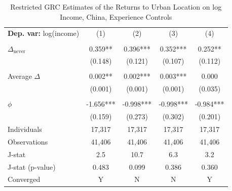 \begin{table}[htbp] \centering \begin{threeparttable}
 \caption{Restricted GRC Estimates of the Returns to Urban Location on log Income, China, Experience Controls} 
 \label{tab:GRC_CHN_income_urban_unb_exp} 
\begin{tabular}{l cccc} \toprule  \textbf{Dep. var:}  log(income) 
                    &\multicolumn{1}{c}{(1)}   &\multicolumn{1}{c}{(2)}   &\multicolumn{1}{c}{(3)}   &\multicolumn{1}{c}{(4)}   \\
                    &               &               &               &               \\
\addlinespace
$\Delta_{\text{never}}$&       0.359** &       0.396***&       0.352***&       0.252** \\
                    &     (0.148)   &     (0.121)   &     (0.107)   &     (0.112)   \\
                    &               &               &               &               \\
\addlinespace
Average $\Delta$    &       0.002** &       0.002***&       0.003***&       0.000   \\
                    &     (0.001)   &     (0.001)   &     (0.001)   &     (0.035)   \\
                    &               &               &               &               \\
\addlinespace
$\phi$              &      -1.656***&      -0.998***&      -0.998***&      -0.984***\\
                    &     (0.159)   &     (0.273)   &     (0.302)   &     (0.201)   \\
\addlinespace
Individuals         &      17,317   &      17,317   &      17,317   &      17,317   \\
Observations        &      41,406   &      41,406   &      41,406   &      41,406   \\
J-stat              &         2.5   &        10.7   &         6.3   &         3.2   \\
J-stat (p-value)    &       0.483   &       0.099   &       0.386   &       0.360   \\
Converged           &           Y   &           N   &           N   &           Y   \\

\end{tabular}
\end{threeparttable}
\end{table}

